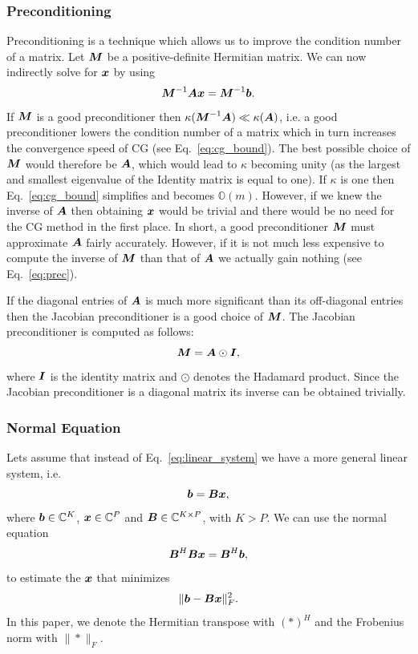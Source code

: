 \documentclass[useAMS,usenatbib]{mn2e}
\newcommand{\bA}{\bmath{A}}
\newcommand{\bB}{\bmath{B}}
\newcommand{\bM}{\bmath{M}}
\newcommand{\bI}{\bmath{I}}
\newcommand{\bb}{\bmath{b}}
\newcommand{\bx}{\bmath{x}}
\begin{document}
\subsubsection{Preconditioning}
\label{sec:precon}
Preconditioning is a technique which allows us to improve the condition number of a matrix. Let $\bM$ be a positive-definite Hermitian matrix.
We can now indirectly solve for $\bx$ by using 
\begin{equation}
\label{eq:prec}
\bM^{-1}\bA\bx = \bM^{-1}\bb.
\end{equation}
If $\bM$ is a good preconditioner then $\kappa(\bM^{-1}\bA) \ll \kappa(\bA)$, i.e. a good preconditioner lowers the condition number of a matrix which in turn increases the convergence speed 
of CG (see Eq.~\eqref{eq:cg_bound}). The best possible choice of $\bM$ would therefore be $\bA$, which would lead to $\kappa$ becoming unity (as the largest and smallest eigenvalue of the Identity matrix is equal to one).
If $\kappa$ is one then Eq.~\eqref{eq:cg_bound} simplifies and becomes $\mathbb{O}(m)$. However, if we knew the inverse of $\bA$ then obtaining $\bx$ would be trivial and there would be no need for the CG method in the first place. 
In short, a good preconditioner $\bM$ must approximate $\bA$ fairly accurately. However, if it is not much less expensive to 
compute the inverse of $\bM$ than that of $\bA$ we actually gain nothing (see Eq.~\eqref{eq:prec}).  

If the diagonal entries of $\bA$ is much more significant than its off-diagonal entries then the 
Jacobian preconditioner is a good choice of $\bM$. The Jacobian preconditioner is computed as follows:
\begin{equation}
\bM = \bA\odot\bI, 
\end{equation}
where $\bI$ is the identity matrix and $\odot$ denotes the Hadamard product. Since the Jacobian preconditioner is a diagonal matrix its inverse can be obtained trivially.

\subsubsection{Normal Equation}
\label{sec:normal}
Lets assume that instead of Eq.~\eqref{eq:linear_system} we have a more general linear system, i.e.
\begin{equation}
 \bb = \bB\bx,
\end{equation}
where $\bb\in\mathbb{C}^K$, $\bx\in\mathbb{C}^P$  and $\bB\in\mathbb{C}^{K \times P}$, with $K > P$. We can use the normal equation 
\begin{equation}
\label{eq:normal_equation}
\bB^H\bB\bx = \bB^H\bb, 
\end{equation}
to estimate the $\bx$ that minimizes
\begin{equation}
\label{eq:norm_ls}
\|\bb-\bB\bx\|_F^2. 
\end{equation}
In this paper, we denote the Hermitian transpose with $(*)^H$ and the Frobenius norm with $\|*\|_F$.
\end{document}
